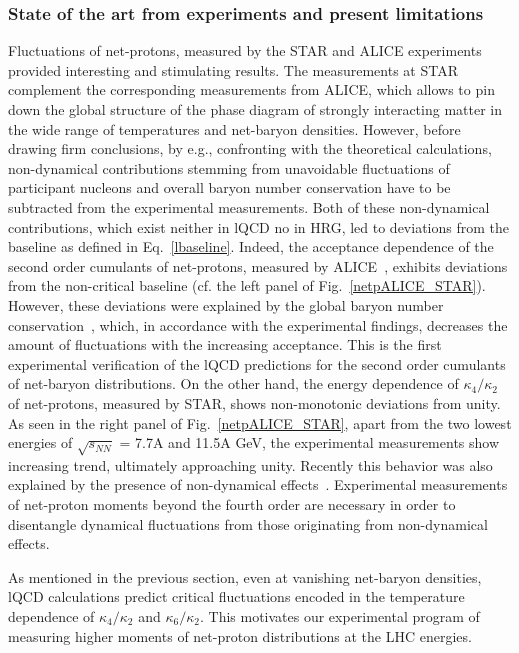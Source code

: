 \subsubsection{State of the art from experiments and present limitations}
Fluctuations of net-protons, measured by the STAR and ALICE experiments provided interesting and stimulating results. The measurements at STAR complement the corresponding measurements from ALICE, which allows to pin down the global structure of the phase diagram of strongly interacting matter in the wide range of temperatures and net-baryon densities. However, before drawing firm conclusions, by e.g., confronting with the theoretical calculations, non-dynamical contributions stemming from unavoidable fluctuations of  participant nucleons and  overall baryon number conservation have to be subtracted from the experimental measurements. Both of these non-dynamical contributions, which exist neither in lQCD no in HRG, led to deviations from the baseline as defined in Eq.~\ref{lbaseline}. Indeed, the acceptance dependence of the second order cumulants of net-protons, measured by ALICE~\cite{Rustamov:2017lio}, exhibits deviations from the non-critical baseline (cf. the left panel of Fig.~\ref{netpALICE_STAR}). However, these deviations were explained by the global baryon number conservation~\cite{Rustamov:2017lio, Braun-Munzinger:2016yjz, Braun-Munzinger:2018yru}, which, in accordance with the experimental findings, decreases the amount of fluctuations with the increasing acceptance. This is the first experimental verification of the lQCD predictions for the second order cumulants of net-baryon distributions. On the other hand, the energy dependence of $\kappa_{4}/\kappa_{2}$ of net-protons, measured by STAR, shows non-monotonic deviations from unity. As seen in the right panel of Fig.~\ref{netpALICE_STAR}, apart from the two lowest energies of $\sqrt{s_{NN}}$ = 7.7A and 11.5A GeV, the experimental measurements show increasing trend, ultimately approaching unity. Recently this  behavior was also explained by the presence of non-dynamical effects~\cite{Braun-Munzinger:2018yru}. Experimental measurements of net-proton moments beyond the fourth order are necessary in order to disentangle dynamical fluctuations from those originating from non-dynamical effects.

As mentioned in the previous section, even at vanishing net-baryon densities, lQCD calculations predict critical fluctuations encoded in the temperature dependence of $\kappa_{4}/\kappa_{2}$ and $\kappa_{6}/\kappa_{2}$. This motivates our experimental program  of measuring higher moments of net-proton distributions at the LHC energies. 


